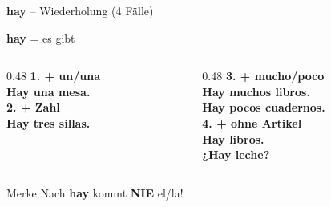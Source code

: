 \documentclass[aspectratio=169, 11pt]{beamer}
\newcommand{\es}[1]{\textbf{\textcolor{spanischrot}{#1}}}
\begin{document}
\begin{frame}{\es{hay} -- Wiederholung (4 Fälle)}

\begin{center}
{\Huge \es{hay} = es gibt}
\end{center}

\vspace{0.5cm}

\begin{columns}[T]
\begin{column}{0.48\textwidth}
\textbf{1. + un/una}\\
\es{Hay \textbf{una} mesa.}\\[0.5em]

\textbf{2. + Zahl}\\
\es{Hay \textbf{tres} sillas.}\\
\end{column}

\begin{column}{0.48\textwidth}
\textbf{3. + mucho/poco}\\
\es{Hay \textbf{muchos} libros.}\\
\es{Hay \textbf{pocos} cuadernos.}\\[0.5em]

\textbf{4. + ohne Artikel}\\
\es{Hay \textbf{libros}.}\\
\es{¿Hay \textbf{leche}?}\\
\end{column}
\end{columns}

\vspace{0.5cm}

\begin{alertblock}{Merke}
Nach \es{hay} kommt \textbf{NIE} el/la!
\end{alertblock}

\end{frame}
\end{document}
